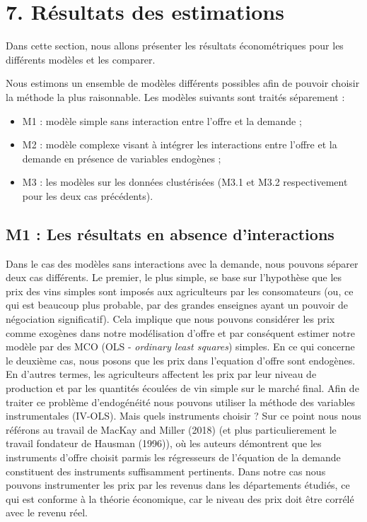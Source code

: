 \documentclass[11pt,]{article}
\providecommand{\tightlist}{%
  \setlength{\itemsep}{0pt}\setlength{\parskip}{0pt}}
\begin{document}
\hypertarget{resultats-des-estimations}{%
\section{7. Résultats des estimations}\label{resultats-des-estimations}}

Dans cette section, nous allons présenter les résultats économétriques
pour les différents modèles et les comparer.

Nous estimons un ensemble de modèles différents possibles afin de
pouvoir choisir la méthode la plus raisonnable. Les modèles suivants
sont traités séparement :

\begin{itemize}
\tightlist
\item
  M1 : modèle simple sans interaction entre l'offre et la demande ;
\item
  M2 : modèle complexe visant à intégrer les interactions entre l'offre
  et la demande en présence de variables endogènes ;
\item
  M3 : les modèles sur les données clustérisées (M3.1 et M3.2
  respectivement pour les deux cas précédents).
\end{itemize}

\hypertarget{m1-les-resultats-en-absence-dinteractions}{%
\subsection{M1 : Les résultats en absence
d'interactions}\label{m1-les-resultats-en-absence-dinteractions}}

Dans le cas des modèles sans interactions avec la demande, nous pouvons
séparer deux cas différents. Le premier, le plus simple, se base sur
l'hypothèse que les prix des vins simples sont imposés aux agriculteurs
par les consomateurs (ou, ce qui est beaucoup plus probable, par des
grandes enseignes ayant un pouvoir de négociation significatif). Cela
implique que nous pouvons considérer les prix comme exogènes dans notre
modélisation d'offre et par conséquent estimer notre modèle par des MCO
(OLS - \emph{ordinary least squares}) simples. En ce qui concerne le
deuxième cas, nous posons que les prix dans l'equation d'offre sont
endogènes. En d'autres termes, les agriculteurs affectent les prix par
leur niveau de production et par les quantités écoulées de vin simple
sur le marché final. Afin de traiter ce problème d'endogénéité nous
pouvons utiliser la méthode des variables instrumentales (IV-OLS). Mais
quels instruments choisir ? Sur ce point nous nous référons au travail
de MacKay and Miller (2018) (et plus particulierement le travail
fondateur de Hausman (1996)), où les auteurs démontrent que les
instruments d'offre choisit parmis les régresseurs de l'équation de la
demande constituent des instruments suffisamment pertinents. Dans notre
cas nous pouvons instrumenter les prix par les revenus dans les
départements étudiés, ce qui est conforme à la théorie économique, car
le niveau des prix doit être corrélé avec le revenu réel.
\end{document}

